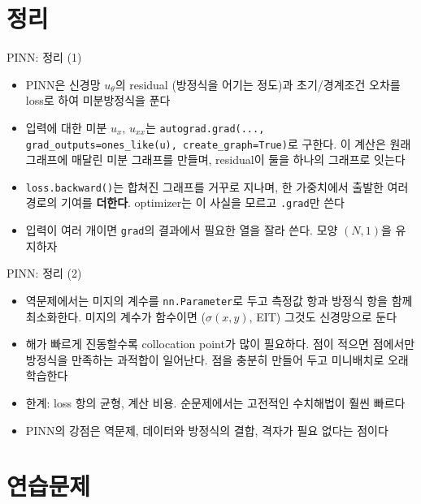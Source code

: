\documentclass[aspectratio=169,11pt]{beamer}
\begin{document}
\section{정리}

\begin{frame}{PINN: 정리 (1)}
\begin{keybox}[정리]
\begin{itemize}
\item PINN은 신경망 $u_\theta$의 residual (방정식을 어기는 정도)과 초기/경계조건 오차를 loss로 하여 미분방정식을 푼다
\item 입력에 대한 미분 $u_x$, $u_{xx}$는 \texttt{autograd.grad(..., grad\_outputs=ones\_like(u), create\_graph=True)}로 구한다.
이 계산은 원래 그래프에 매달린 미분 그래프를 만들며, residual이 둘을 하나의 그래프로 잇는다
\item \texttt{loss.backward()}는 합쳐진 그래프를 거꾸로 지나며, 한 가중치에서 출발한 여러 경로의 기여를 \textbf{더한다}.
optimizer는 이 사실을 모르고 \texttt{.grad}만 쓴다
\item 입력이 여러 개이면 \texttt{grad}의 결과에서 필요한 열을 잘라 쓴다. 모양 $(N,1)$을 유지하자
\end{itemize}
\end{keybox}
\end{frame}

\begin{frame}{PINN: 정리 (2)}
\begin{keybox}[정리]
\begin{itemize}
\item 역문제에서는 미지의 계수를 \texttt{nn.Parameter}로 두고 측정값 항과 방정식 항을 함께 최소화한다.
미지의 계수가 함수이면 ($\sigma(x,y)$, EIT) 그것도 신경망으로 둔다
\item 해가 빠르게 진동할수록 collocation point가 많이 필요하다. 점이 적으면 점에서만 방정식을 만족하는 과적합이 일어난다.
점을 충분히 만들어 두고 미니배치로 오래 학습한다
\item 한계: loss 항의 균형, 계산 비용. 순문제에서는 고전적인 수치해법이 훨씬 빠르다
\item PINN의 강점은 역문제, 데이터와 방정식의 결합, 격자가 필요 없다는 점이다
\end{itemize}
\end{keybox}
\end{frame}

\section{연습문제}
\end{document}
